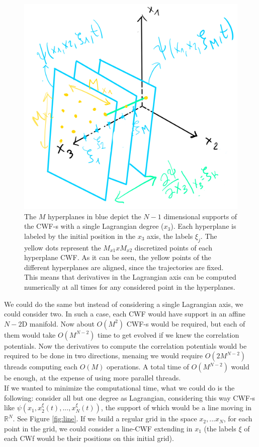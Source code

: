 \documentclass[11pt, a4paper]{article} %
\newcommand{\R}{\mathbb{R}} %
\DeclareRobustCommand{\mybox}[2][gray!10]{%
\begin{tcolorbox}[   %
        left=0.2cm,
        right=0.2cm,
        top=0.15cm,
        bottom=0.15cm,
        colback=#1,
        colframe=#1,
        width=\dimexpr\textwidth\relax, 
        enlarge left by=0mm,
        boxsep=5pt,
        arc=0pt,outer arc=0pt,
        ]
        #2
\end{tcolorbox}
}
\begin{document}
\begin{figure}[h!]
  \centering
    \includegraphics[width=0.5\linewidth]{hyperplaness.png}
  \caption{The $M$ hyperplanes in blue depict the $N-1$ dimensional supports of the CWF-s with a single Lagrangian degree ($x_3$). Each hyperplane is labeled by the initial position in the $x_3$ axis, the labels $\xi_j$. The yellow dots represent the $M_{x1}xM_{x2}$ discretized points of each hyperplane CWF. As it can be seen, the yellow points of the different hyperplanes are aligned, since the trajectories are fixed. This means that derivatives in the Lagrangian axis can be computed numerically at all times for any considered point in the hyperplanes.}
  \label{fig:hyperplane}
\end{figure}
\mybox{
We could do the same but instead of considering a single Lagrangian axis, we could consider two. In such a case, each CWF would have support in an affine $N-2$D manifold. Now about $O(M^2)$ CWF-s would be required, but each of them would take $O(M^{N-2})$ time to get evolved if we knew the correlation potentials. Now the derivatives to compute the correlation potentials would be required to be done in two directions, menaing we would require $O(2M^{N-2})$ threads computing each $O(M)$ operations. A total time of $O(M^{N-2})$ would be enough, at the expense of using more parallel threads.\\

If we wanted to minimize the computational time, what we could do is the following: consider all but one degree as Lagrangian, considering this way CWF-s like $\psi(x_1,x_2^\xi(t), ...,x_N^\xi(t))$, the support of which would be a line moving in $\R^N$. See Figure \ref{fig:line}. If we build a regular grid in the space $x_2,...x_N$, for each point in the grid, we could consider a line-CWF extending in $x_1$ (the labels $\xi$ of each CWf would be their positions on this initial grid).}
\end{document}
